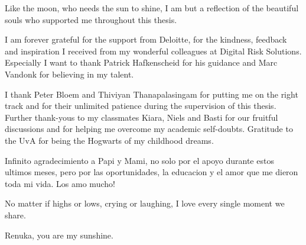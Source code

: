 Like the moon, who needs the sun to shine, I am but a reflection of the beautiful souls who supported me throughout this thesis.

I am forever grateful for the support from Deloitte, for the kindness, feedback and inspiration I received from my wonderful colleagues at Digital Risk Solutions. Especially I want to thank Patrick Hafkenscheid for his guidance and Marc Vandonk for believing in my talent.

I thank Peter Bloem and Thiviyan Thanapalasingam for putting me on the right track and for their unlimited patience during the supervision of this thesis. Further thank-yous to my classmates Kiara, Niels and Basti for our fruitful discussions and for helping me overcome my academic self-doubts. Gratitude to the UvA for being the Hogwarts of my childhood dreams.

Infinito agradecimiento a Papi y Mami, no solo por el apoyo durante estos ultimos meses, pero por las oportunidades, la educacion y el amor que me dieron toda mi vida. Los amo mucho!

No matter if highs or lows, crying or laughing, I love every single moment we share. 

\begin{center}
    Renuka, you are my sunshine. \\\emojisun 
\end{center}